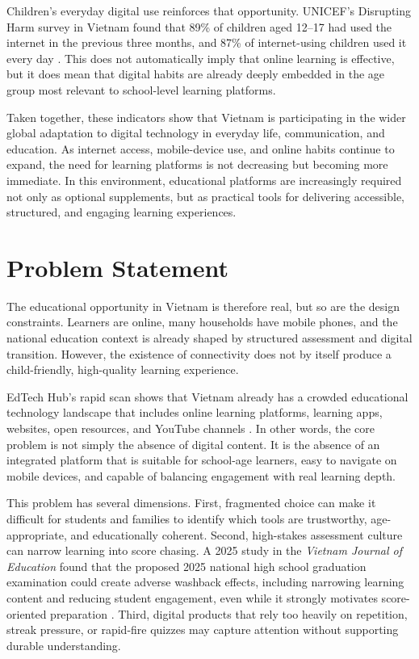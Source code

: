Children's everyday digital use reinforces that opportunity. UNICEF's Disrupting Harm survey in Vietnam found that 89\% of children aged 12--17 had used the internet in the previous three months, and 87\% of internet-using children used it every day \cite{unicef-disrupting-harm-vietnam-2022}. This does not automatically imply that online learning is effective, but it does mean that digital habits are already deeply embedded in the age group most relevant to school-level learning platforms.

Taken together, these indicators show that Vietnam is participating in the wider global adaptation to digital technology in everyday life, communication, and education. As internet access, mobile-device use, and online habits continue to expand, the need for learning platforms is not decreasing but becoming more immediate. In this environment, educational platforms are increasingly required not only as optional supplements, but as practical tools for delivering accessible, structured, and engaging learning experiences.

\section{Problem Statement}

The educational opportunity in Vietnam is therefore real, but so are the design constraints. Learners are online, many households have mobile phones, and the national education context is already shaped by structured assessment and digital transition. However, the existence of connectivity does not by itself produce a child-friendly, high-quality learning experience.

EdTech Hub's rapid scan shows that Vietnam already has a crowded educational technology landscape that includes online learning platforms, learning apps, websites, open resources, and YouTube channels \cite{edtechhub-vietnam-scan}. In other words, the core problem is not simply the absence of digital content. It is the absence of an integrated platform that is suitable for school-age learners, easy to navigate on mobile devices, and capable of balancing engagement with real learning depth.

This problem has several dimensions. First, fragmented choice can make it difficult for students and families to identify which tools are trustworthy, age-appropriate, and educationally coherent. Second, high-stakes assessment culture can narrow learning into score chasing. A 2025 study in the \textit{Vietnam Journal of Education} found that the proposed 2025 national high school graduation examination could create adverse washback effects, including narrowing learning content and reducing student engagement, even while it strongly motivates score-oriented preparation \cite{vje-washback-2025}. Third, digital products that rely too heavily on repetition, streak pressure, or rapid-fire quizzes may capture attention without supporting durable understanding.

